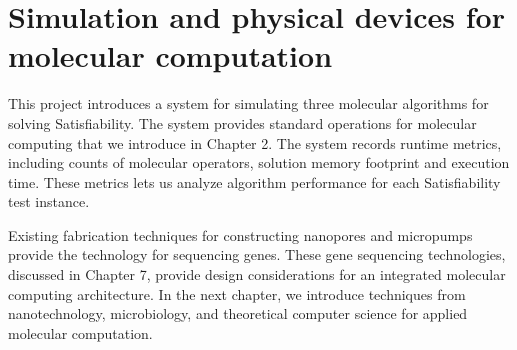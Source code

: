 \section{Simulation and physical devices for molecular computation}
	
This project introduces a system for simulating three molecular algorithms for solving {\sc Satisfiability}.  The system provides standard operations for molecular computing that we introduce in Chapter 2.  The system records runtime metrics, including counts of molecular operators, solution memory footprint and execution time.  These metrics lets us analyze algorithm performance for each {\sc Satisfiability} test instance.

Existing fabrication techniques for constructing nanopores \cite{ionTorrent, oxfordNanopore} and micropumps \cite{Liao_Lee_Liu_Hsieh_Luo_2005} provide the technology for sequencing genes.  These gene sequencing technologies, discussed in Chapter 7, provide design considerations for an integrated molecular computing architecture.  In the next chapter, we introduce techniques from nanotechnology, microbiology, and theoretical computer science for applied molecular computation.
